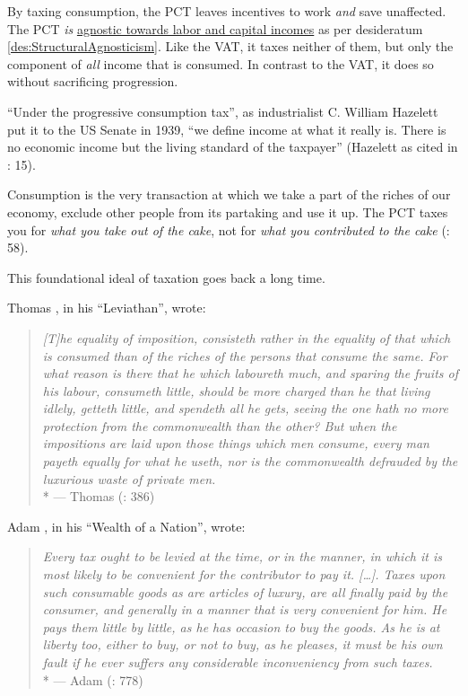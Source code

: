 By taxing consumption, the PCT leaves incentives to work \emph{and} save unaffected. The PCT \emph{is} \hyperref[des:StructuralAgnosticism]{agnostic towards labor and capital incomes} as per desideratum \ref{des:StructuralAgnosticism}. Like the VAT, it taxes neither of them, but only the component of \emph{all} income that is consumed. In contrast to the VAT, it does so without sacrificing progression.

``Under the progressive consumption tax'', as industrialist C. William Hazelett put it to the US Senate in 1939, ``we define income at what it really is. There is no economic income but the living standard of the taxpayer'' (Hazelett as cited in \citealt{Bank2004}: 15).

Consumption is the very transaction at which we take a part of the riches of our economy, exclude other people from its partaking and use it up. The PCT taxes you for \emph{what you take out of the cake}, not for \emph{what you contributed to the cake} (\citealt{Seidman1997}: 58).

This foundational ideal of taxation goes back a long time.

Thomas \citeauthor{Hobbes-1651-aa}, in his ``Leviathan'', wrote:

\begin{quote}
	\emph{[T]he equality of imposition, consisteth rather in the equality of that which is consumed than of the riches of the persons that consume the same. For what reason is there that he which laboureth much, and sparing the fruits of his labour, consumeth little, should be more charged than he that living idlely, getteth little, and spendeth all he gets, seeing the one hath no more protection from the commonwealth than the other? But when the impositions are laid upon those things which men consume, every man payeth equally for what he useth, nor is the commonwealth defrauded by the luxurious waste of private men.}\\*
	--- Thomas \citeauthor{Hobbes-1651-aa} (\citeyear{Hobbes-1651-aa}: 386)
\end{quote}

Adam \citeauthor{Smith-1776-lq}, in his ``Wealth of a Nation'', wrote:

\begin{quote}
	\emph{Every tax ought to be levied at the time, or in the manner, in which it is most likely to be convenient for the contributor to pay it. [\ldots]. Taxes upon such consumable goods as are articles of luxury, are all finally paid by the consumer, and generally in a manner that is very convenient for him. He pays them little by little, as he has occasion to buy the goods. As he is at liberty too, either to buy, or not to buy, as he pleases, it must be his own fault if he ever suffers any considerable inconveniency from such taxes.}\\*
	--- Adam \citeauthor{Smith-1776-lq} (\citeyear{Smith-1776-lq}: 778)
\end{quote}

